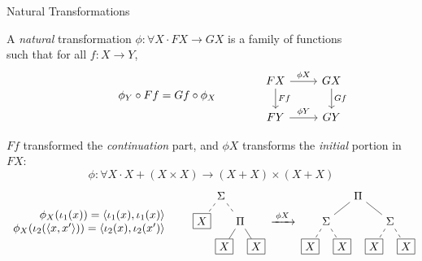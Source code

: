 \documentclass[aspectratio=1610,mathserif]{beamer}
\begin{document}
\begin{frame}[fragile]{Natural Transformations} %
  \begin{definition}
    A \emph{natural} transformation
    $\phi : \forall X \cdot F X \rightarrow G X$
    is a family of functions \\ such that
    for all $f : X \rightarrow Y$,
    \vspace{-1.5em}
    \[
      \qquad \qquad
      \phi_Y \circ F f = G f \circ \phi_X
      \qquad \qquad
      \begin{tikzcd}
        F X \ar[r, "\phi X"]
            \ar[d, "F f"] &
        G X \ar[d, "G f"] \\
        F Y \ar[r, "\phi Y"] &
        G Y
      \end{tikzcd}
    \]
    \vspace{-1em}
  \end{definition}
  \pause
  $F f$ transformed the \emph{continuation} part, and
  $\phi X$ transforms the \emph{initial} portion in $FX$:
      \[ \phi : \forall X \cdot X + (X \times X) \rightarrow
                            (X + X) \times (X + X) \]
  \[
    \begin{array}{r}
      \phi_X( \iota_1(x) ) = \langle \iota_1(x), \iota_1(x) \rangle \\
      \phi_X( \iota_2(\langle x, x' \rangle) ) =
        \langle \iota_2(x), \iota_2(x') \rangle
    \end{array}
    \qquad
    \begin{tikzpicture}
      [baseline=(B.base),
       level distance=8mm,
       level 1/.style={sibling distance=1.2cm,edge from parent/.style={draw,dashed}},
       level 2/.style={sibling distance=1cm,edge from parent/.style={draw,solid}}]
      \node {$\Sigma$}
        child { node[draw] (B) {$X$} }
        child {
          node {$\Pi$}
          child { node[draw,solid] {$X$} }
          child { node[draw,solid] {$X$} }
        };
    \end{tikzpicture}
    \:
    \xrightarrow{\: \phi X \:}
    \:
    \begin{tikzpicture}
      [baseline=(B.base),
       level distance=8mm,
       level 1/.style={sibling distance=2cm,edge from parent/.style={draw,solid}},
       level 2/.style={sibling distance=1cm,edge from parent/.style={draw,dashed}}]
      \node {$\Pi$}
        child {
          node {$\Sigma$}
          child { node[draw,solid] {$X$} }
          child { node[draw,solid] {$X$} }
        }
        child {
          node {$\Sigma$}
          child { node[draw,solid] {$X$} }
          child { node[draw,solid] {$X$} }
        };
    \end{tikzpicture}
  \]
\end{frame}
\end{document}
